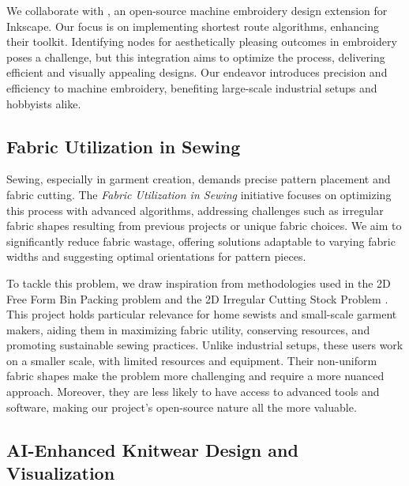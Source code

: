 \documentclass{article}
\begin{document}
    We collaborate with \cite{inkstitch}, an open-source machine embroidery design extension for Inkscape.
    Our focus is on implementing shortest route algorithms, enhancing their toolkit. Identifying nodes for
    aesthetically pleasing outcomes in embroidery poses a challenge, but this integration aims to optimize the
    process, delivering efficient and visually appealing designs. Our endeavor introduces precision and efficiency to
    machine embroidery, benefiting large-scale industrial setups and hobbyists alike.

    \subsection{Fabric Utilization in Sewing}

    Sewing, especially in garment creation, demands precise pattern placement and fabric cutting. The \emph{Fabric
    Utilization in Sewing} initiative focuses on optimizing this process with advanced algorithms, addressing
    challenges such as irregular fabric shapes resulting from previous projects or unique fabric choices. We aim to
    significantly reduce fabric wastage, offering solutions adaptable to varying fabric widths and suggesting optimal
    orientations for pattern pieces.

    To tackle this problem, we draw inspiration from methodologies used in the 2D Free Form Bin Packing problem and the
    2D Irregular Cutting Stock Problem \cite{bennell2009tutorial, xu2016efficient}.
    This project holds particular relevance for home sewists and small-scale garment makers, aiding them in
    maximizing fabric utility, conserving resources, and promoting sustainable sewing practices. Unlike industrial
    setups, these users work on a smaller scale, with limited resources and equipment. Their non-uniform fabric
    shapes make the problem more challenging and require a more nuanced approach. Moreover, they are less likely to
    have access to advanced tools and software, making our project's open-source nature all the more valuable.

    \subsection{AI-Enhanced Knitwear Design and Visualization}
\end{document}

